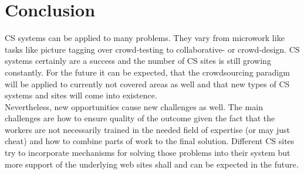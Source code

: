 \documentclass{acm_proc_article-sp}
\begin{document}
  \section{Conclusion}
  \label{sect:conclusion}
  CS systems can be applied to many problems. They vary from microwork like tasks like picture tagging over crowd-testing to collaborative- or crowd-design. CS systems certainly are a success and the number of CS sites is still growing constantly. For the future it can be expected, that the crowdsourcing paradigm will be applied to currently not covered areas as well and that new types of CS systems and sites will come into existence.\\
  Nevertheless, new opportunities cause new challenges as well. The main challenges are how to ensure quality of the outcome given the fact that the workers are not necessarily trained in the needed field of expertise (or may just cheat) and how to combine parts of work to the final solution. Different CS sites try to incorporate mechanisms for solving those problems into their system but more support of the underlying web sites shall and can be expected in the future.

  
\end{document}
